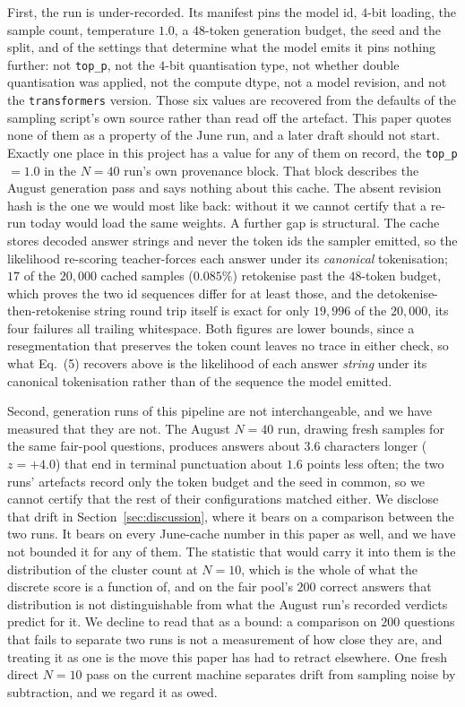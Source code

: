 First, the run is under-recorded. Its manifest pins the model id, $4$-bit loading, the sample
count, temperature $1.0$, a $48$-token generation budget, the seed and the split, and of the
settings that determine what the model emits it pins nothing further: not \texttt{top\_p}, not
the $4$-bit quantisation type, not whether double quantisation was applied, not the compute
dtype, not a model revision, and not the \texttt{transformers} version. Those six values are
recovered from the defaults of the sampling script's own source rather than read off the
artefact. This paper quotes none of them as a property of the June run, and a later draft
should not start. Exactly one place in this project has a value for any of them on record, the
\texttt{top\_p}${=}1.0$ in the $N{=}40$ run's own provenance block. That block describes the
August generation pass and says nothing about this cache. The absent revision hash is the one
we would most like back: without it we cannot certify that a re-run today would load the same
weights. A further gap is structural. The cache stores decoded answer strings and never the
token ids the sampler emitted, so the likelihood re-scoring teacher-forces each answer under
its \emph{canonical} tokenisation; $17$ of the $20{,}000$ cached samples ($0.085\%$) retokenise
past the $48$-token budget, which proves the two id sequences differ for at least those, and
the detokenise-then-retokenise string round trip itself is exact for only $19{,}996$ of the
$20{,}000$, its four failures all trailing whitespace. Both figures are lower bounds, since a
resegmentation that preserves the token count leaves no trace in either check, so what Eq.~(5)
recovers above is the likelihood of each answer \emph{string} under its canonical tokenisation
rather than of the sequence the model emitted.

Second, generation runs of this pipeline are not interchangeable, and we have measured that
they are not. The August $N{=}40$ run, drawing fresh samples for the same fair-pool questions,
produces answers about $3.6$ characters longer ($z{=}+4.0$) that end in terminal punctuation
about $1.6$ points less often; the two runs' artefacts record only the token budget and the
seed in common, so we cannot certify that the rest of their configurations matched either. We
disclose that drift in Section~\ref{sec:discussion}, where it bears on a comparison between the
two runs. It bears on every June-cache number in this paper as well, and we have not bounded it
for any of them. The statistic that would carry it into them is the distribution of the cluster
count at $N{=}10$, which is the whole of what the discrete score is a function of, and on the
fair pool's $200$ correct answers that distribution is not distinguishable from what the August
run's recorded verdicts predict for it. We decline to read that as a bound: a comparison on
$200$ questions that fails to separate two runs is not a measurement of how close they are, and
treating it as one is the move this paper has had to retract elsewhere. One fresh direct
$N{=}10$ pass on the current machine separates drift from sampling noise by subtraction, and we
regard it as owed.

